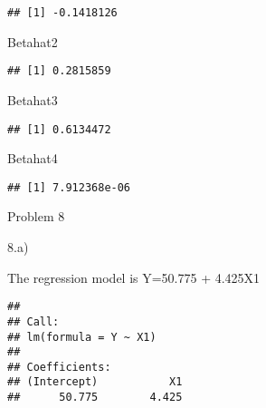 \documentclass[
]{article}
\newenvironment{Shaded}{\begin{snugshade}}{\end{snugshade}}
\newcommand{\FunctionTok}[1]{\textcolor[rgb]{0.00,0.00,0.00}{#1}}
\newcommand{\NormalTok}[1]{#1}
\newcommand{\OtherTok}[1]{\textcolor[rgb]{0.56,0.35,0.01}{#1}}
\newcommand{\SpecialCharTok}[1]{\textcolor[rgb]{0.00,0.00,0.00}{#1}}
\begin{document}
\begin{verbatim}
## [1] -0.1418126
\end{verbatim}

\begin{Shaded}
\begin{Highlighting}[]
\NormalTok{Betahat2}
\end{Highlighting}
\end{Shaded}

\begin{verbatim}
## [1] 0.2815859
\end{verbatim}

\begin{Shaded}
\begin{Highlighting}[]
\NormalTok{Betahat3}
\end{Highlighting}
\end{Shaded}

\begin{verbatim}
## [1] 0.6134472
\end{verbatim}

\begin{Shaded}
\begin{Highlighting}[]
\NormalTok{Betahat4}
\end{Highlighting}
\end{Shaded}

\begin{verbatim}
## [1] 7.912368e-06
\end{verbatim}

Problem 8

8.a)

The regression model is Y=50.775 + 4.425X1

\begin{Shaded}
\end{Shaded}

\begin{verbatim}
## 
## Call:
## lm(formula = Y ~ X1)
## 
## Coefficients:
## (Intercept)           X1  
##      50.775        4.425
\end{verbatim}
\end{document}
